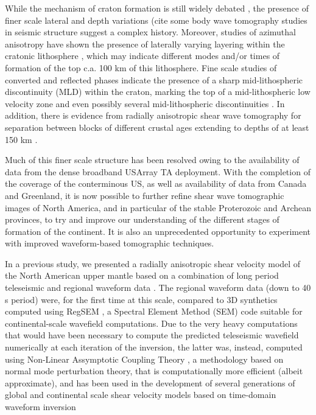 \documentclass[12pt]{article}
\begin{document}
While the mechanism of craton formation is still widely debated \citep[e.g.][]{s2005archean,lee2011building}, the presence of finer scale lateral and depth variations {\color{red} (cite some body wave tomography studies} in seismic structure suggest a complex history. Moreover, studies of azimuthal anisotropy have shown the presence of laterally varying layering within the cratonic lithosphere \citep[e.g.][]{levin1999shear,deschamps2008stratified,yuan2010lithospheric}, which may indicate different modes and/or times of formation of the top c.a. 100 km of this lithosphere. Fine scale studies of converted and reflected phases indicate the presence of a sharp mid-lithospheric discontinuity (MLD) within the craton, marking the top of a mid-lithospheric low velocity zone \citep{thybo1997seismic,bostock1998mantle,abt2010north,fischer2010lithosphere,rader2015characterization,ford2016midlithospheric} and even possibly several mid-lithospheric discontinuities \citep{calo2016layered}. In addition, there is evidence from radially anisotropic shear wave tomography for separation between blocks of different crustal ages extending to depths of at least 150 km \citep[e.g.][]{yuan2014lithospheric}.


Much of this finer scale structure has been resolved owing to the availability of data from the dense broadband USArray TA deployment. With the completion of the coverage of the conterminous US, as well as availability of data from Canada and Greenland, it is now possible to further refine shear wave tomographic images of North America, and in particular of the stable Proterozoic and Archean provinces, to try and improve our understanding of the different stages of formation of the continent. It is also an unprecedented opportunity to experiment with improved waveform-based tomographic techniques.

In a previous study, we presented a radially anisotropic shear velocity model of the North American upper mantle based on a combination of long period teleseismic and regional waveform data \citep{yuan2014lithospheric}. The regional waveform data (down to 40 s period) were, for the first time at this scale, compared to 3D synthetics computed using RegSEM \citep{cupillard2012regsem}, a Spectral Element Method (SEM) code suitable for continental-scale wavefield computations. Due to the very heavy computations that would have been necessary to compute the predicted teleseismic wavefield numerically at each iteration of the inversion, the latter was, instead, computed using Non-Linear Assymptotic Coupling Theory \citep[NACT,][]{li1995comparison}, a methodology based on normal mode perturbation theory, that is computationally more efficient (albeit approximate), and has been used in the development of several generations of global and continental scale shear velocity models based on time-domain waveform inversion \citep{li1996global,megnin2000three,gung2003global,panning2006three,yuan20113}
 
\end{document}
